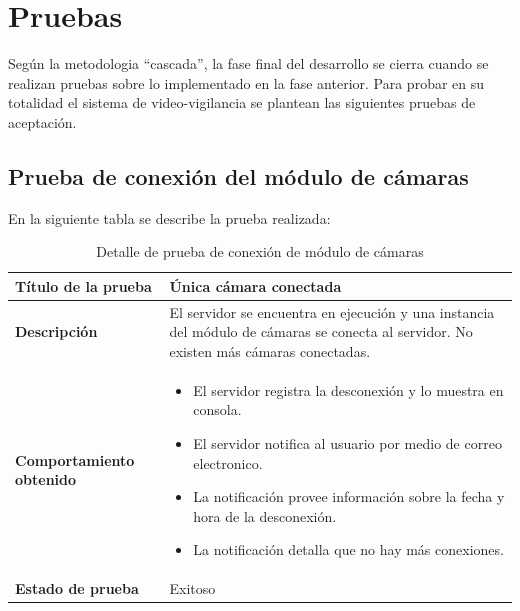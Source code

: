 \chapter{Pruebas}

Según la metodologia ``cascada'', la fase final del desarrollo se cierra cuando se realizan pruebas sobre lo implementado en la fase anterior. Para probar en su totalidad el sistema de video-vigilancia se plantean las siguientes pruebas de aceptación.\\

\section{Prueba de conexión del módulo de cámaras}
En la siguiente tabla se describe la prueba realizada:\\

\begin{table}[H]
    \caption{Detalle de prueba de conexión de módulo de cámaras}
    \begin{center}
        \begin{tabular}{|>{\centering}p{}|m{}<{\centering}|} 
            \hline
            \textbf{Título de la prueba} & Única cámara conectada \\
            \hline
            \textbf{Descripción} & El servidor se encuentra en ejecución y una instancia del módulo de cámaras se conecta al servidor. No existen más cámaras conectadas.\\
            \hline
            \textbf{Comportamiento obtenido} & 
            \begin{itemize}
                \item El servidor registra la desconexión y lo muestra en consola.
                \item El servidor notifica al usuario por medio de correo electronico.
                \item La notificación provee información sobre la fecha y hora de la desconexión.
                \item La notificación detalla que no hay más conexiones.
            \end{itemize} \\ 
            \hline
            \textbf{Estado de prueba} & Exitoso \\
            \hline
        \end{tabular}
    \end{center}
\end{table}

